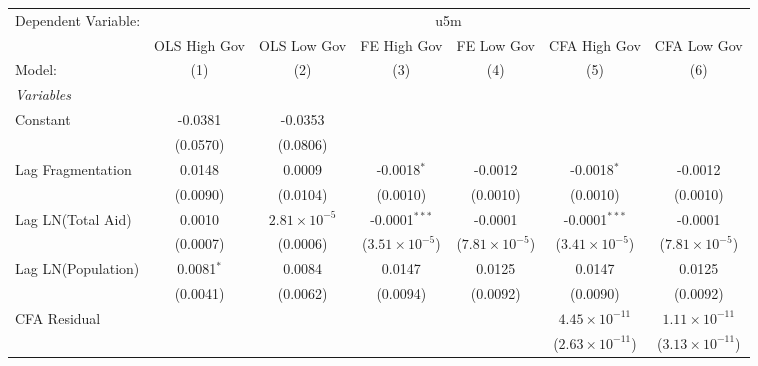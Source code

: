 \begingroup
\centering
\begin{tabular}{lcccccc}
   \tabularnewline \midrule \midrule
   Dependent Variable: & \multicolumn{6}{c}{u5m}\\
                      & OLS High Gov & OLS Low Gov           & FE High Gov             & FE Low Gov              & CFA High Gov             & CFA Low Gov \\   
   Model:             & (1)          & (2)                   & (3)                     & (4)                     & (5)                      & (6)\\  
   \midrule
   \emph{Variables}\\
   Constant           & -0.0381      & -0.0353               &                         &                         &                          &   \\   
                      & (0.0570)     & (0.0806)              &                         &                         &                          &   \\   
   Lag Fragmentation  & 0.0148       & 0.0009                & -0.0018$^{*}$           & -0.0012                 & -0.0018$^{*}$            & -0.0012\\   
                      & (0.0090)     & (0.0104)              & (0.0010)                & (0.0010)                & (0.0010)                 & (0.0010)\\   
   Lag LN(Total Aid)  & 0.0010       & $2.81\times 10^{-5}$  & -0.0001$^{***}$         & -0.0001                 & -0.0001$^{***}$          & -0.0001\\   
                      & (0.0007)     & (0.0006)              & ($3.51\times 10^{-5}$)  & ($7.81\times 10^{-5}$)  & ($3.41\times 10^{-5}$)   & ($7.81\times 10^{-5}$)\\    
   Lag LN(Population) & 0.0081$^{*}$ & 0.0084                & 0.0147                  & 0.0125                  & 0.0147                   & 0.0125\\   
                      & (0.0041)     & (0.0062)              & (0.0094)                & (0.0092)                & (0.0090)                 & (0.0092)\\   
   CFA Residual       &              &                       &                         &                         & $4.45\times 10^{-11}$    & $1.11\times 10^{-11}$\\    
                      &              &                       &                         &                         & ($2.63\times 10^{-11}$)  & ($3.13\times 10^{-11}$)\\    

\end{tabular}
